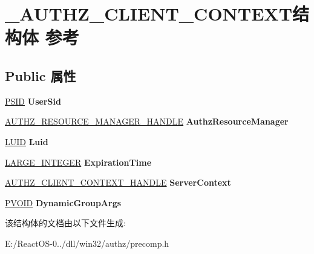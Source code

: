\hypertarget{struct___a_u_t_h_z___c_l_i_e_n_t___c_o_n_t_e_x_t}{}\section{\+\_\+\+A\+U\+T\+H\+Z\+\_\+\+C\+L\+I\+E\+N\+T\+\_\+\+C\+O\+N\+T\+E\+X\+T结构体 参考}
\label{struct___a_u_t_h_z___c_l_i_e_n_t___c_o_n_t_e_x_t}
\subsection*{Public 属性}
\begin{DoxyCompactItemize}
\item 
\mbox{\label{struct___a_u_t_h_z___c_l_i_e_n_t___c_o_n_t_e_x_t_a7d88330f3578b3d1687ce6832a1daec2}} 
\hyperlink{struct___s_i_d}{P\+S\+ID} {\bfseries User\+Sid}
\item 
\mbox{\label{struct___a_u_t_h_z___c_l_i_e_n_t___c_o_n_t_e_x_t_a74e1e7f59b38bfe79cb9cf3b1b337fd8}} 
\hyperlink{interfacevoid}{A\+U\+T\+H\+Z\+\_\+\+R\+E\+S\+O\+U\+R\+C\+E\+\_\+\+M\+A\+N\+A\+G\+E\+R\+\_\+\+H\+A\+N\+D\+LE} {\bfseries Authz\+Resource\+Manager}
\item 
\mbox{\label{struct___a_u_t_h_z___c_l_i_e_n_t___c_o_n_t_e_x_t_ab6409f84fb1880b31c77f04f974d5a67}} 
\hyperlink{struct___l_u_i_d}{L\+U\+ID} {\bfseries Luid}
\item 
\mbox{\label{struct___a_u_t_h_z___c_l_i_e_n_t___c_o_n_t_e_x_t_a5d2f4d051964a86baefa88cdbe4716a5}} 
\hyperlink{union___l_a_r_g_e___i_n_t_e_g_e_r}{L\+A\+R\+G\+E\+\_\+\+I\+N\+T\+E\+G\+ER} {\bfseries Expiration\+Time}
\item 
\mbox{\label{struct___a_u_t_h_z___c_l_i_e_n_t___c_o_n_t_e_x_t_a082784fefd1616912f5489c613a1c5e5}} 
\hyperlink{interfacevoid}{A\+U\+T\+H\+Z\+\_\+\+C\+L\+I\+E\+N\+T\+\_\+\+C\+O\+N\+T\+E\+X\+T\+\_\+\+H\+A\+N\+D\+LE} {\bfseries Server\+Context}
\item 
\mbox{\label{struct___a_u_t_h_z___c_l_i_e_n_t___c_o_n_t_e_x_t_a4330eea652d9557108150e5230a85fe6}} 
\hyperlink{interfacevoid}{P\+V\+O\+ID} {\bfseries Dynamic\+Group\+Args}
\end{DoxyCompactItemize}


该结构体的文档由以下文件生成\+:\begin{DoxyCompactItemize}
\item 
E\+:/\+React\+O\+S-\/0../dll/win32/authz/precomp.\+h\end{DoxyCompactItemize}
